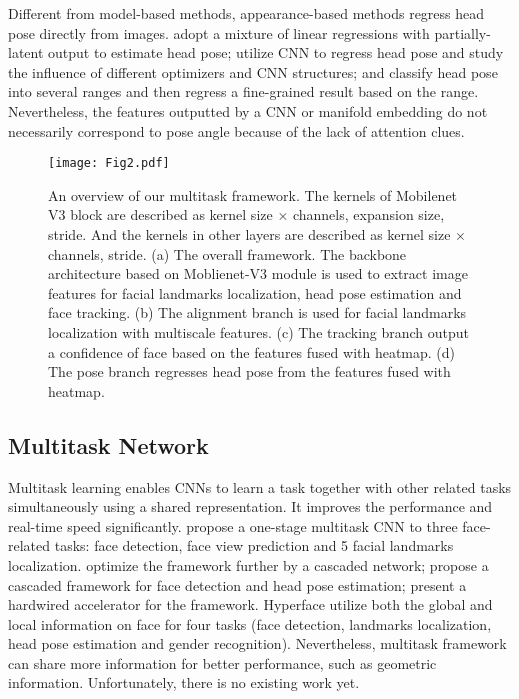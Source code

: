 \documentclass[3p,twocolumn, round, sort & compress]{elsarticle}
\begin{document}
Different from model-based methods, appearance-based methods regress head pose directly from images. \citep{Robust_pose} adopt a mixture of linear regressions with partially-latent output to estimate head pose; \citep{CNN-Pose} utilize CNN to regress head pose and study the influence of different optimizers and CNN structures; \citep{Ruzi} and \citep{FSA-Net} classify head pose into several ranges and then regress a fine-grained result based on the range. Nevertheless, the features outputted by a CNN or manifold embedding do not necessarily correspond to pose angle because of the lack of attention clues.

\begin{figure*}[t!]
	\centering
	\texttt{[image: Fig2.pdf]}
	\caption{An overview of our multitask framework. The kernels of Mobilenet V3 block are described as kernel size $\times$ channels, expansion size, stride. And the kernels in other layers are described as kernel size $\times$ channels, stride. (a) The overall framework. The backbone architecture based on Moblienet-V3 module is used to extract image features for facial landmarks localization, head pose estimation and face tracking. (b) The alignment branch is used for facial landmarks localization with multiscale features. (c) The tracking branch output a confidence of face based on the features fused with heatmap. (d) The pose branch regresses head pose from the features fused with heatmap.}
	\label{fig2}
\end{figure*}

\subsection{Multitask Network}
Multitask learning enables CNNs to learn a task together with other related tasks simultaneously using a shared representation. It improves the performance and real-time speed significantly. \citep{zhang-multi} propose a one-stage multitask CNN to three face-related tasks: face detection, face view prediction and 5 facial landmarks localization. \citep{MTCNN} optimize the framework further by a cascaded network; \citep{Multitask-pose} propose a cascaded framework for face detection and head pose estimation; \citep{Hard-MTCNN} present a hardwired accelerator for the framework. Hyperface \citep{Hyperface} utilize both the global and local information on face for four tasks (face detection, landmarks localization, head pose estimation and gender recognition). Nevertheless, multitask framework can share more information for better performance, such as geometric information. Unfortunately, there is no existing work yet.
\end{document}
